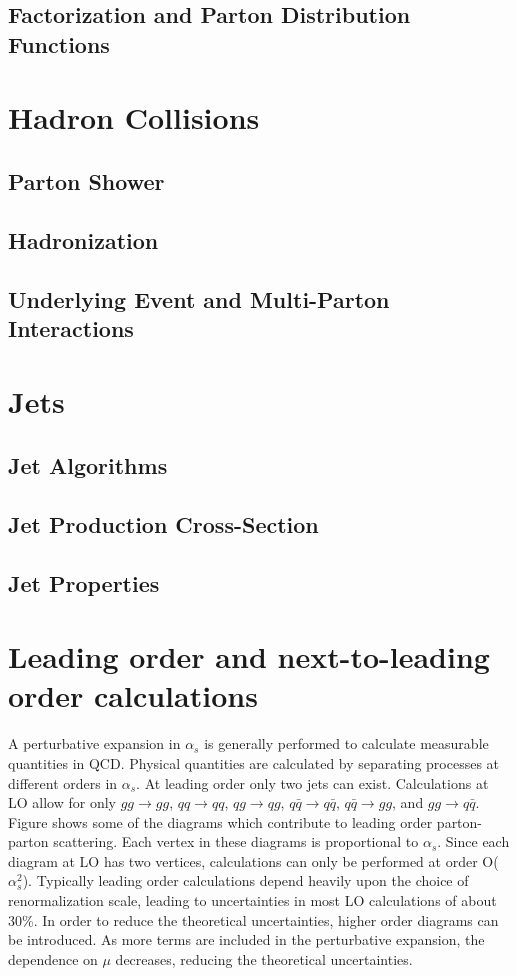 \subsection{Factorization and Parton Distribution Functions}

\section{Hadron Collisions}
\subsection{Parton Shower}
\subsection{Hadronization}
\subsection{Underlying Event and Multi-Parton Interactions}

\section{Jets}
\label{sec:jets}
\subsection{Jet Algorithms}
\label{sec:jet_algos}
\subsection{Jet Production Cross-Section}

\subsection{Jet Properties}

\section{Leading order and next-to-leading order calculations}

A perturbative expansion in $\alpha_{s}$ is generally performed to calculate
measurable quantities in QCD. Physical quantities are calculated 
by separating processes at different orders in $\alpha_{s}$.
At leading order only two jets can exist. Calculations at LO allow for
only 
$gg \rightarrow gg$,
$qq \rightarrow qq$, 
$qg \rightarrow qg$,
$q\bar{q} \rightarrow q\bar{q}$,
$q\bar{q} \rightarrow gg$, and
$gg \rightarrow q\bar{q}$.
Figure shows some of the diagrams which
contribute to leading order parton-parton scattering.
Each vertex in these diagrams is proportional to $\alpha_{s}$. Since 
each diagram at LO has two vertices, calculations can only be performed
at order O($\alpha^{2}_{s}$).
Typically leading order calculations depend heavily upon the choice
of renormalization scale, leading to uncertainties in most LO calculations
of about 30\%.
In order to reduce the theoretical uncertainties, 
higher order diagrams can be introduced. 
As more terms are included in the perturbative expansion, 
the dependence on $\mu$ decreases, reducing the theoretical uncertainties.

